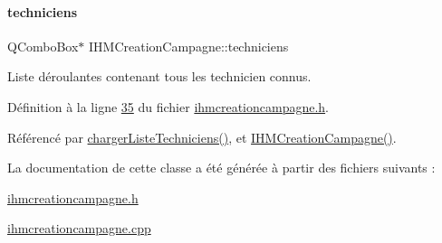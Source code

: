 \mbox{\label{class_i_h_m_creation_campagne_a8235e7a18cda1298be624a59a4cc1a56}} 
\paragraph{\texorpdfstring{techniciens}{techniciens}}
{\footnotesize\ttfamily Q\+Combo\+Box$\ast$ I\+H\+M\+Creation\+Campagne\+::techniciens\hspace{0.3cm}{\ttfamily [private]}}



Liste déroulantes contenant tous les technicien connus. 



Définition à la ligne \hyperlink{ihmcreationcampagne_8h_source_l00035}{35} du fichier \hyperlink{ihmcreationcampagne_8h_source}{ihmcreationcampagne.\+h}.



Référencé par \hyperlink{ihmcreationcampagne_8cpp_source_l00061}{charger\+Liste\+Techniciens()}, et \hyperlink{ihmcreationcampagne_8cpp_source_l00011}{I\+H\+M\+Creation\+Campagne()}.



La documentation de cette classe a été générée à partir des fichiers suivants \+:\begin{DoxyCompactItemize}
\item 
\hyperlink{ihmcreationcampagne_8h}{ihmcreationcampagne.\+h}\item 
\hyperlink{ihmcreationcampagne_8cpp}{ihmcreationcampagne.\+cpp}\end{DoxyCompactItemize}
